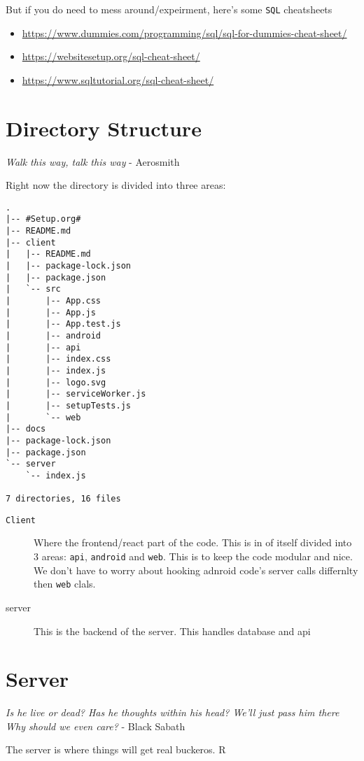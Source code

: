 \documentclass[11pt]{article}
\begin{document}
But if you do need to mess around/expeirment, here's some \texttt{SQL} cheatsheets
\begin{itemize}
\item \url{https://www.dummies.com/programming/sql/sql-for-dummies-cheat-sheet/}
\item \url{https://websitesetup.org/sql-cheat-sheet/}
\item \url{https://www.sqltutorial.org/sql-cheat-sheet/}
\end{itemize}

\subsubsection*{}
\label{sec:org62f0325}

\section*{Directory Structure}
\label{sec:org2a7ae67}
\begin{center}
\emph{Walk this way, talk this way} - Aerosmith
\end{center}
Right now the directory is divided into three areas: 
\begin{verbatim}
.
|-- #Setup.org#
|-- README.md
|-- client
|   |-- README.md
|   |-- package-lock.json
|   |-- package.json
|   `-- src
|       |-- App.css
|       |-- App.js
|       |-- App.test.js
|       |-- android
|       |-- api
|       |-- index.css
|       |-- index.js
|       |-- logo.svg
|       |-- serviceWorker.js
|       |-- setupTests.js
|       `-- web
|-- docs
|-- package-lock.json
|-- package.json
`-- server
    `-- index.js

7 directories, 16 files
\end{verbatim}

\begin{description}
\item[{\texttt{Client}}] Where the frontend/react part of the code. This is in of itself divided into 3 areas: \texttt{api}, \texttt{android} and \texttt{web}. This is to keep the code modular and nice. We don't have to worry about hooking adnroid code's server calls differnlty then \texttt{web} clals.
\item[{server}] This is the backend of the server. This handles database and api
\end{description}

\section*{Server}
\label{sec:org602f5c0}
\begin{center}
\emph{Is he live or dead? Has he thoughts within his head? We'll just pass him there Why should we even care?} - Black Sabath
\end{center}

The server is where things will get real buckeros. R
\end{document}
